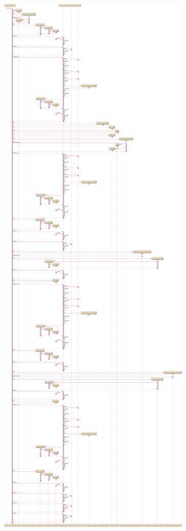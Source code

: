 \includegraphics[width=\textwidth,height=\textheight,keepaspectratio]{Schemas/UserServlet_doPost.svg.pdf}


